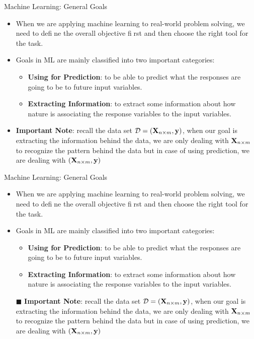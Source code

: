 \documentclass[compress,oilve]{beamer}
\begin{document}
\begin{frame}{Machine Learning: General Goals}
\begin{itemize}
\item When we are applying machine learning to real-world
problem solving, we need to define the overall objective first and then choose the right tool
for the task.
\item Goals in ML are mainly classified into two important categories:
\begin{itemize}
\item \textbf{Using for Prediction}: to be able to predict what the responses are going to be to future input variables.
\item \textbf{Extracting Information}: to extract some information about how nature is associating the response variables to the input variables.
\end{itemize}
\item \textbf{Important Note}: recall the data set $ \mathcal{D} = (\mathbf{X_{\mathnormal n \times \mathnormal m}} , \mathbf{y}) $, when our goal is extracting the information behind the data, we are only dealing with $ \mathbf{X_{\mathnormal n \times \mathnormal m}} $ to recognize the pattern behind the data but in case of using prediction, we are dealing with $ (\mathbf{X_{\mathnormal n \times \mathnormal m}} , \mathbf{y}) $
\end{itemize}
\end{frame}


\begin{frame}{Machine Learning: General Goals}
\begin{itemize}
\item When we are applying machine learning to real-world
problem solving, we need to define the overall objective first and then choose the right tool
for the task.
\item Goals in ML are mainly classified into two important categories:
\begin{itemize}
\item \textbf{Using for Prediction}: to be able to predict what the responses are going to be to future input variables.
\item \textbf{Extracting Information}: to extract some information about how nature is associating the response variables to the input variables.
\end{itemize}
\item[$\blacksquare$] \textbf{Important Note}: recall the data set $ \mathcal{D} = (\mathbf{X_{\mathnormal n \times \mathnormal m}} , \mathbf{y}) $, when our goal is extracting the information behind the data, we are only dealing with $ \mathbf{X_{\mathnormal n \times \mathnormal m}} $ to recognize the pattern behind the data but in case of using prediction, we are dealing with $ (\mathbf{X_{\mathnormal n \times \mathnormal m}} , \mathbf{y}) $
\end{itemize}
\end{frame}
\end{document}
